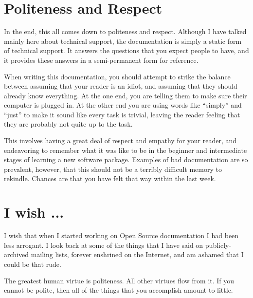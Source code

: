 \section*{Politeness and Respect}
In the end, this all comes down to politeness and respect. Although I have talked mainly here about technical support, the documentation is simply a static form of technical support. It answers the questions that you expect people to have, and it provides these answers in a semi-permanent form for reference.

When writing this documentation, you should attempt to strike the balance between assuming that your reader is an idiot, and assuming that they should already know everything. At the one end, you are telling them to make sure their computer is plugged in. At the other end you are using words like ``simply'' and ``just'' to make it sound like every task is trivial, leaving the reader feeling that they are probably not quite up to the task.

This involves having a great deal of respect and empathy for your reader, and endeavoring to remember what it was like to be in the beginner and intermediate stages of learning a new software package. Examples of bad documentation are so prevalent, however, that this should not be a terribly difficult memory to rekindle. Chances are that you have felt that way within the last week.

\section*{I wish ...}
I wish that when I started working on Open Source documentation I had been less arrogant. I look back at some of the things that I have said on publicly-archived mailing lists, forever enshrined on the Internet, and am ashamed that I could be that rude.

The greatest human virtue is politeness. All other virtues flow from it. If you cannot be polite, then all of the things that you accomplish amount to little.
